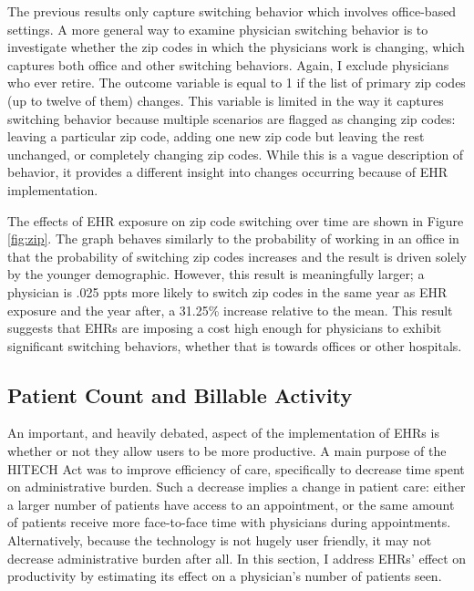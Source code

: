 \documentclass[11pt]{article}
\begin{document}
The previous results only capture switching behavior which involves office-based settings. A more general way to examine physician switching behavior is to investigate whether the zip codes in which the physicians work is changing, which captures both office and other switching behaviors. Again, I exclude physicians who ever retire. The outcome variable is equal to 1 if the list of primary zip codes (up to twelve of them) changes. This variable is limited in the way it captures switching behavior because multiple scenarios are flagged as changing zip codes: leaving a particular zip code, adding one new zip code but leaving the rest unchanged, or completely changing zip codes. While this is a vague description of behavior, it provides a different insight into changes occurring because of EHR implementation.

The effects of EHR exposure on zip code switching over time are shown in Figure \ref{fig:zip}. The graph behaves similarly to the probability of working in an office in that the probability of switching zip codes increases and the result is driven solely by the younger demographic. However, this result is meaningfully larger; a physician is .025 ppts more likely to switch zip codes in the same year as EHR exposure and the year after, a 31.25\% increase relative to the mean. This result suggests that EHRs are imposing a cost high enough for physicians to exhibit significant switching behaviors, whether that is towards offices or other hospitals.




\subsection{Patient Count and Billable Activity}\label{sec:patientcount}

An important, and heavily debated, aspect of the implementation of EHRs is whether or not they allow users to be more productive. A main purpose of the HITECH Act was to improve efficiency of care, specifically to decrease time spent on administrative burden. Such a decrease implies a change in patient care: either a larger number of patients have access to an appointment, or the same amount of patients receive more face-to-face time with physicians during appointments. Alternatively, because the technology is not hugely user friendly, it may not decrease administrative burden after all. In this section, I address EHRs' effect on productivity by estimating its effect on a physician's number of patients seen. 
\end{document}
